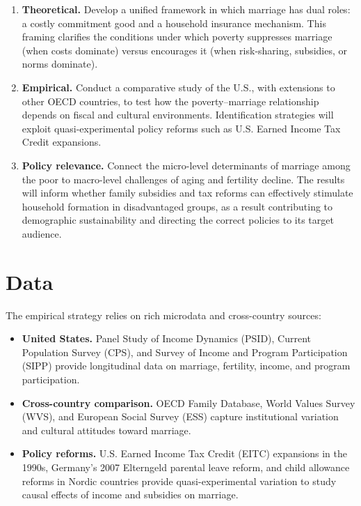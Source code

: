 \begin{enumerate}
\item \textbf{Theoretical.} Develop a unified framework in which marriage has dual roles: a costly commitment good and a household insurance mechanism. This framing clarifies the conditions under which poverty suppresses marriage (when costs dominate) versus encourages it (when risk-sharing, subsidies, or norms dominate).
\item \textbf{Empirical.} Conduct a comparative study of the U.S., with extensions to other OECD countries, to test how the poverty–marriage relationship depends on fiscal and cultural environments. Identification strategies will exploit quasi-experimental policy reforms such as U.S. Earned Income Tax Credit expansions.
\item \textbf{Policy relevance.} Connect the micro-level determinants of marriage among the poor to macro-level challenges of aging and fertility decline. The results will inform whether family subsidies and tax reforms can effectively stimulate household formation in disadvantaged groups, as a result contributing to demographic sustainability and directing the correct policies to its target audience.
\end{enumerate}

\section*{Data}

The empirical strategy relies on rich microdata and cross-country sources:

\begin{itemize}
\item \textbf{United States.} Panel Study of Income Dynamics (PSID), Current Population Survey (CPS), and Survey of Income and Program Participation (SIPP) provide longitudinal data on marriage, fertility, income, and program participation.
\item \textbf{Cross-country comparison.} OECD Family Database, World Values Survey (WVS), and European Social Survey (ESS) capture institutional variation and cultural attitudes toward marriage.
\item \textbf{Policy reforms.} U.S. Earned Income Tax Credit (EITC) expansions in the 1990s, Germany’s 2007 Elterngeld parental leave reform, and child allowance reforms in Nordic countries provide quasi-experimental variation to study causal effects of income and subsidies on marriage.
\end{itemize}

